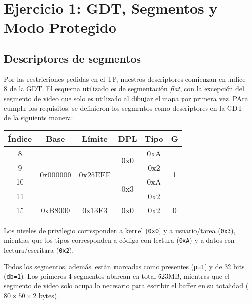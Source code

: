 \section{Ejercicio 1: GDT, Segmentos y Modo Protegido}

	\subsection{Descriptores de segmentos}

	Por las restricciones pedidas en el TP, nuestros descriptores comienzan en índice 8 de la GDT. El esquema utilizado es de segmentación \textit{flat}, con la excepción del segmento de video que solo es utilizado al dibujar el mapa por primera vez. PAra cumplir los requisitos, se definieron los segmentos como descriptores en la GDT de la siguiente manera:

	\begin{center}
		\begin{tabular}{ | c | c | c | c | c | c | }
		\hline
		Índice &                      Base &                   Límite &                  DPL & Tipo &                  G \\ \hline
		     8 & \multirow{4}{*}{0x000000} & \multirow{4}{*}{0x26EFF} & \multirow{2}{*}{0x0} &  0xA & \multirow{4}{*}{1} \\ \cline{5-5}
		     9 &                           &                          &                      &  0x2 &                    \\ \cline{4-5}
		    10 &                           &                          & \multirow{2}{*}{0x3} &  0xA &                    \\ \cline{5-5}
		    11 &                           &                          &                      &  0x2 &                    \\ \cline{2-6}
		    15 &                   0xB8000 &                   0x13F3 &                  0x0 &  0x2 &                  0 \\
		\hline
		\end{tabular}
	\end{center}

	Los niveles de privilegio corresponden a kernel (\texttt{0x0}) y a usuario/tarea (\texttt{0x3}), mientras que los tipos corresponden a código con lectura (\texttt{0xA}) y a datos con lectura/escritura (\texttt{0x2}).

	Todos los segmentos, además, están marcados como presentes (\texttt{p=1}) y de 32 bits (\texttt{db=1}). Los primeros 4 segmentos abarcan en total 623MB, mientras que el segmento de video solo ocupa lo necesario para escribir el buffer en su totalidad ($80 \times 50 \times 2$ bytes).

